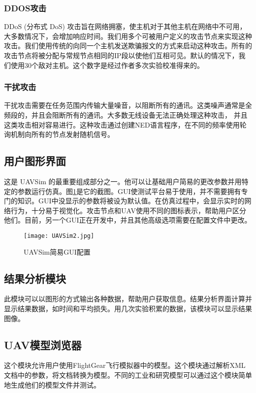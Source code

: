 \documentclass[bachelor,fontset=fandol,AutoFakeBold=true]{nuaathesis}
\begin{document}
            \subsubsection{DDOS攻击}
            DDoS (分布式 DoS) 攻击旨在网络拥塞，使主机对于其他主机在网络中不可用，大多数情况下，会增加响应时间。我们用多个可被用户定义的攻击节点来实现这种攻击。我们使用传统的向同一个主机发送欺骗报文的方式来启动这种攻击。所有的攻击节点将被分配与常规节点相同的IP段以使他们互相可见。默认的情况下，我们使用30个敌对主机。这个数字是经过作者多次实验校准得来的。
            \subsubsection{干扰攻击}
            干扰攻击需要在任务范围内传输大量噪音，以阻断所有的通讯。这类噪声通常是全频段的，并且会阻断所有的通讯。大多数无线设备无法正确处理这种攻击， 并且这类攻击相对容易进行。这种攻击通过创建NED语言程序，在不同的频率使用轮询机制向所有的节点发射随机信号。
            
        
        \subsection{用户图形界面}
        这是 UAVSim 的最重要组成部分之一。他可以让基础用户简易的更改参数并用特定的参数运行仿真。图\ref{fig4}是它的截图。GUI使测试平台易于使用，并不需要拥有专门的知识。GUI中没显示的参数将被设为默认值。在仿真过程中，会显示实时的网络行为，十分易于视觉化。攻击节点和UAV使用不同的图标表示，帮助用户区分他们。目前，另一个GUI正在开发中，并且其他高级选项需要在配置文件中更改。
        \begin{figure}[]
	        \centering          	
            \texttt{[image: UAVSim2.jpg]}  
        \caption{UAVSim简易GUI配置} \label{fig4}
        \end{figure}
        
        \subsection{结果分析模块}
        此模块可以以图形的方式输出各种数据，帮助用户获取信息。结果分析界面计算并显示结果数据，如时间和平均损失。用几次实验积累的数据，该模块可以显示结果图像。
        \subsection{UAV模型浏览器}
        这个模块允许用户使用FlightGear飞行模拟器中的模型。这个模块通过解析XML文档中的参数，将文档转换为模型。不同的工业和研究模型可以通过这个模块简单地生成他们的模型文件并测试。
        
\end{document}
